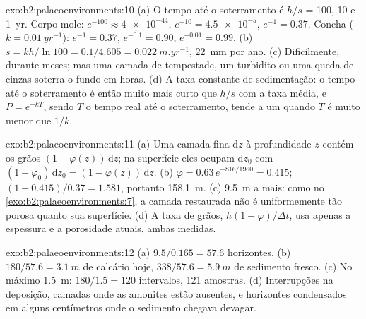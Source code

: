 \begin{solution}{exo:b2:palaeoenvironments:10}
(a) O tempo até o soterramento é $h/s$ = 100, 10 e \qty{1}{yr}. Corpo mole: $e^{-100} \approx
\num{4e-44}$, $e^{-10} = \num{4.5e-5}$, $e^{-1} = 0.37$. Concha ($k = \qty{0.01}{yr^{-1}}$):
$e^{-1} = 0.37$, $e^{-0.1} = 0.90$, $e^{-0.01} = 0.99$. (b) $s = kh/\ln 100 = 0.1/4.605 =
\qty{0.022}{m.yr^{-1}}$, \qty{22}{mm} por ano. (c) Dificilmente, durante meses; mas uma camada de tempestade, um
turbidito ou uma queda de cinzas soterra o fundo em horas. (d) A taxa constante de sedimentação: o
tempo até o soterramento é então muito mais curto que $h/s$ com a taxa média, e $P = e^{-kT}$, sendo $T$
o tempo real até o soterramento, tende a um quando $T$ é muito menor que $1/k$.
\end{solution}

\begin{solution}{exo:b2:palaeoenvironments:11}
(a) Uma camada fina $\mathrm dz$ à profundidade $z$ contém os grãos $(1 - \varphi(z))\,\mathrm dz$;
na superfície eles ocupam $\mathrm dz_0$ com $(1 - \varphi_0)\,\mathrm dz_0 = (1 -
\varphi(z))\,\mathrm dz$. (b) $\varphi = 0.63\,e^{-816/1960} = 0.415$; $(1 - 0.415)/0.37 =
1.581$, portanto \qty{158.1}{m}. (c) \qty{9.5}{m} a mais: como no \cref{exo:b2:palaeoenvironments:7},
a camada restaurada não é uniformemente tão porosa quanto sua superfície. (d) A taxa de grãos,
$h(1-\varphi)/\Delta t$, usa apenas a espessura e a porosidade atuais, ambas medidas.
\end{solution}

\begin{solution}{exo:b2:palaeoenvironments:12}
(a) $9.5/0.165 = 57.6$ horizontes. (b) $180/57.6 = \qty{3.1}{m}$ de calcário hoje, $338/57.6 =
\qty{5.9}{m}$ de sedimento fresco. (c) No máximo \qty{1.5}{m}: $180/1.5 = 120$ intervalos, 121
amostras. (d) Interrupções na deposição, camadas onde as amonites estão ausentes, e horizontes condensados em
alguns centímetros onde o sedimento chegava devagar.
\end{solution}

